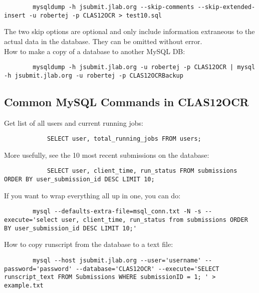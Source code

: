     \begin{lstlisting}
        mysqldump -h jsubmit.jlab.org --skip-comments --skip-extended-insert -u robertej -p CLAS12OCR > test10.sql  
    \end{lstlisting}
    
    The two skip options are optional and only include information extraneous to the actual data in the database. They can be omitted without error.\\
    
    How to make a copy of a database to another MySQL DB:

    \begin{lstlisting}
        mysqldump -h jsubmit.jlab.org -u robertej -p CLAS12OCR | mysql -h jsubmit.jlab.org -u robertej -p CLAS12OCRBackup
    \end{lstlisting}    
    
    \subsection{Common MySQL Commands in CLAS12OCR}
    
        Get list of all users and current running jobs:
        
        \begin{lstlisting}
            SELECT user, total_running_jobs FROM users;
        \end{lstlisting}
        
        More usefully, see the 10 most recent submissions on the database:
        
        \begin{lstlisting}
            SELECT user, client_time, run_status FROM submissions ORDER BY user_submission_id DESC LIMIT 10;
        \end{lstlisting}
        
        
        If you want to wrap everything all up in one, you can do: 
        \begin{lstlisting}
        mysql --defaults-extra-file=msql_conn.txt -N -s --execute='select user, client_time, run_status from submissions ORDER BY user_submission_id DESC LIMIT 10;' 
        \end{lstlisting}
        
        
        How to copy runscript from the database to a text file:
        \begin{lstlisting}
        mysql --host jsubmit.jlab.org --user='username' --password='password' --database='CLAS12OCR' --execute='SELECT runscript_text FROM Submissions WHERE submissionID = 1; ' > example.txt
        \end{lstlisting}

